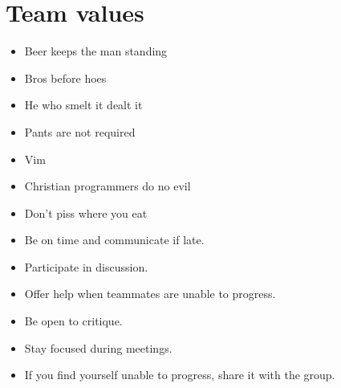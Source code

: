 \section{Team values}
\begin{itemize}
  \item Beer keeps the man standing
  \item Bros before hoes
  \item He who smelt it dealt it
  \item Pants are not required
  \item Vim
  \item Christian programmers do no evil
  \item Don't piss where you eat

  \item Be on time and communicate if late.
  \item Participate in discussion.
  \item Offer help when teammates are unable to progress.
  \item Be open to critique.
  \item Stay focused during meetings.
  \item If you find yourself unable to progress, share it with the group.
\end{itemize}